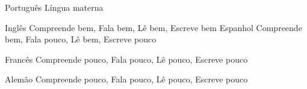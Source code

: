 

\begin{cvskills}

  \cvskill
    {Português} %
    {Língua materna} %

  \cvskill
    {Inglês} %
    {Compreende bem, Fala bem, Lê bem, Escreve bem} %
  \cvskill
    {Espanhol} %
    {Compreende bem, Fala pouco, Lê bem, Escreve pouco} %

  \cvskill
    {Francês} %
    {Compreende pouco, Fala pouco, Lê pouco, Escreve pouco} %

  \cvskill
    {Alemão} %
    {Compreende pouco, Fala pouco, Lê pouco, Escreve pouco} %

\end{cvskills}
